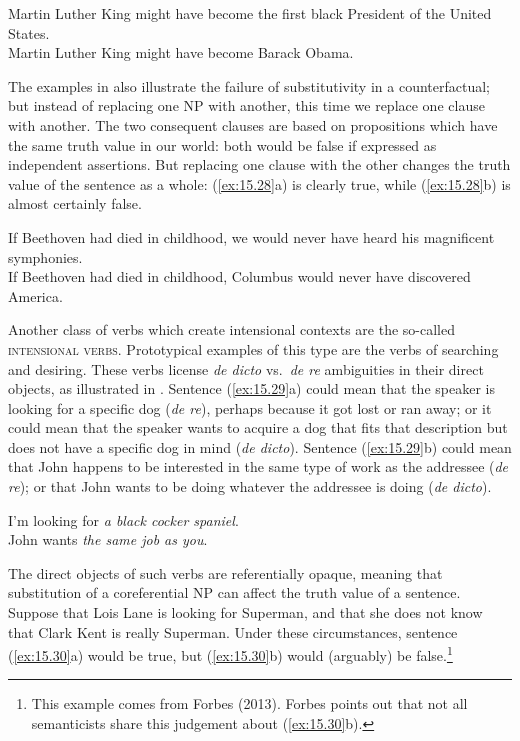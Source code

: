 \ea \label{ex:15.27}
\ea  Martin Luther King might have become the first black President of the United States.\\
\ex Martin Luther King might have become Barack Obama.
                       \z
\z


The examples in  also illustrate the failure of substitutivity in a counterfactual; but instead of replacing one NP with another, this time we replace one clause with another. The two consequent clauses are based on propositions which have the same truth value in our world: both would be false if expressed as independent assertions. But replacing one clause with the other changes the truth value of the sentence as a whole: (\ref{ex:15.28}a) is clearly true, while (\ref{ex:15.28}b) is almost certainly false.


\ea \label{ex:15.28}
\ea  If Beethoven had died in childhood, we would never have heard his magnificent symphonies.\\
\ex If Beethoven had died in childhood, Columbus would never have discovered America.
                       \z
\z


Another class of verbs which create intensional contexts are the so-called \textsc{intensional verbs}. Prototypical examples of this type are the verbs of searching and desiring. These verbs license \textit{de dicto} vs.~\textit{de re} ambiguities in their direct objects, as illustrated in . Sentence (\ref{ex:15.29}a) could mean that the speaker is looking for a specific dog (\textit{de re}), perhaps because it got lost or ran away; or it could mean that the speaker wants to acquire a dog that fits that description but does not have a specific dog in mind (\textit{de dicto}). Sentence (\ref{ex:15.29}b) could mean that John happens to be interested in the same type of work as the addressee (\textit{de re}); or that John wants to be doing whatever the addressee is doing (\textit{de dicto}).


\ea \label{ex:15.29}
\ea  I’m looking for \textit{a black cocker spaniel}.\\
\ex John wants \textit{the same job as you}.
                       \z
\z


The direct objects of such verbs are referentially opaque, meaning that substitution of a coreferential NP can affect the truth value of a sentence. Suppose that Lois Lane is looking for Superman, and that she does not know that Clark Kent is really Superman. Under these circumstances, sentence (\ref{ex:15.30}a) would be true, but (\ref{ex:15.30}b) would (arguably) be false.\footnote{This example comes from Forbes (2013). Forbes points out that not all semanticists share this judgement about (\ref{ex:15.30}b).}

